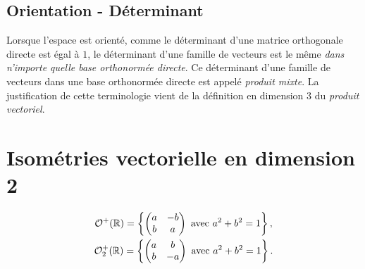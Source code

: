 \subsection{Orientation - Déterminant}
Lorsque l'espace est orienté, comme le déterminant d'une matrice orthogonale directe est égal à $1$, le déterminant d'une famille de vecteurs est le même \emph{dans n'importe quelle base orthonormée directe}. Ce déterminant d'une famille de vecteurs dans une base orthonormée directe est appelé \emph{produit mixte}. La justification de cette terminologie vient de la définition en dimension $3$ du \emph{produit vectoriel}.
 \clearpage
\section{Isométries vectorielle en dimension 2}
\begin{prop}
\begin{multline*}
 \mathcal{O}^+(\mathbb{R}) = \left\lbrace 
 \begin{pmatrix}
  a & -b \\ b & a
 \end{pmatrix}
\text{ avec } a^2 + b^2 = 1\right\rbrace ,
\\
\mathcal O_2^+(\mathbb{R}) =
\left\lbrace 
 \begin{pmatrix}
  a & b \\ b & -a
 \end{pmatrix}
\text{ avec } a^2 + b^2 = 1\right\rbrace .
\end{multline*}
\end{prop}
